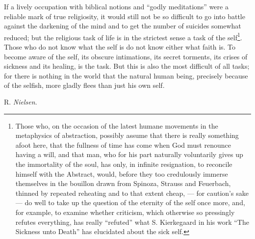 \documentclass[12pt,a4paper,openany]{book}
\newcommand{\signature}[1]{\par\smallskip\hfill #1\hspace*{2em}\par}
\begin{document}
If a lively occupation with biblical notions and ``godly meditations'' were a reliable mark of true religiosity, it would still not be so difficult to go into battle against the darkening of the mind and to get the number of suicides somewhat reduced; but the religious task of life is in the strictest sense a task of the self\footnote[1]{Those who, on the occasion of the latest humane movements in the metaphysics of abstraction, possibly assume that there is really something afoot here, that the fullness of time has come when God must renounce having a will, and that man, who for his part naturally voluntarily gives up the immortality of the soul, has only, in infinite resignation, to reconcile himself with the Abstract, would, before they too credulously immerse themselves in the bouillon drawn from Spinoza, Strauss and Feuerbach, thinned by repeated reheating and to that extent cheap, --- for caution's sake --- do well to take up the question of the eternity of the self once more, and, for example, to examine whether criticism, which otherwise so pressingly refutes everything, has really ``refuted'' what S. Kierkegaard in his work ``The Sickness unto Death'' has elucidated about the sick self.}. Those who do not know what the self is
do not know either what faith is. To become aware of the self, its obscure intimations, its secret torments, its crises of sickness and its healing, is the task. But this is also the most difficult of all tasks; for there is nothing in the world that the natural human being, precisely because of the selfish, more gladly flees than just his own self.

\signature{R. \emph{Nielsen}.}
\end{document}

